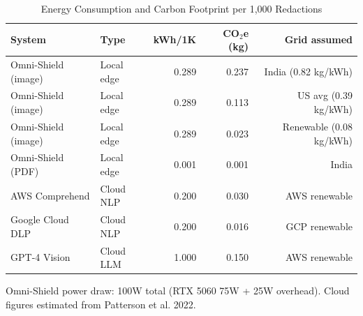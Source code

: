 \begin{table}[h]\centering
\caption{Energy Consumption and Carbon Footprint per 1,000 Redactions}
\label{tab:energy}
\begin{tabular}{llrrr}
\toprule
System & Type & kWh/1K & CO$_2$e (kg) & Grid assumed \\
\midrule
Omni-Shield (image) & Local edge  & 0.289 & 0.237 & India (0.82 kg/kWh) \\
Omni-Shield (image) & Local edge  & 0.289 & 0.113 & US avg (0.39 kg/kWh) \\
Omni-Shield (image) & Local edge  & 0.289 & 0.023 & Renewable (0.08 kg/kWh) \\
Omni-Shield (PDF)   & Local edge  & 0.001 & 0.001 & India \\
AWS Comprehend      & Cloud NLP   & 0.200 & 0.030 & AWS renewable \\
Google Cloud DLP    & Cloud NLP   & 0.200 & 0.016 & GCP renewable \\
GPT-4 Vision        & Cloud LLM   & 1.000 & 0.150 & AWS renewable \\
\bottomrule
\end{tabular}
\footnotesize{Omni-Shield power draw: 100W total (RTX 5060 75W + 25W overhead).
Cloud figures estimated from Patterson et al. 2022.}
\end{table}
